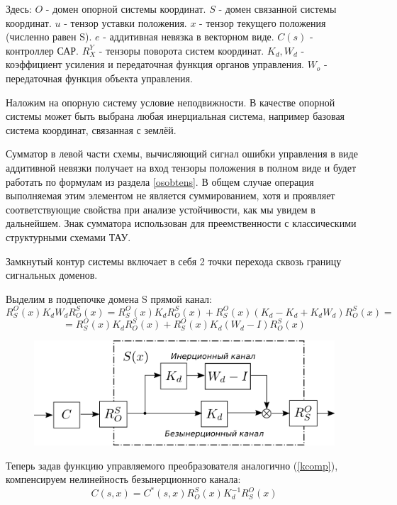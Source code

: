\documentclass[a4paper]{article}
\begin{document}
Здесь:
$O$ - домен опорной системы координат. 
$S$ - домен связанной системы координат.
$u$ - тензор уставки положения.
$x$ - тензор текущего положения (численно равен S).
$e$ - аддитивная невязка в векторном виде.
$C(s)$ - контроллер САР.
$R_X^Y$ - тензоры поворота систем координат.
$K_d, W_d$ - коэффициент усиления и передаточная функция органов управления.
$W_o$ - передаточная функция объекта управления.

Наложим на опорную систему условие неподвижности. В качестве опорной системы может быть выбрана любая инерциальная система, например базовая система координат, связанная с землёй.

Сумматор в левой части схемы, вычисляющий сигнал ошибки управления в виде аддитивной невязки получает на вход тензоры положения в полном виде и будет работать по формулам из раздела \ref{osobtens}. В общем случае операция выполняемая этим элементом не является суммированием, хотя и проявляет соответствующие свойства при анализе устойчивости, как мы увидем в дальнейшем. Знак сумматора использован для преемственности с классическими структурными схемами ТАУ.

Замкнутый контур системы включает в себя 2 точки перехода сквозь границу сигнальных доменов.

Выделим в подцепочке домена S прямой канал:
\begin{equation*} 
R_S^O(x) K_d W_d R_O^S(x) = R_S^O(x) K_d R_O^S(x) + R_S^O(x) (K_d - K_d + K_d W_d) R_O^S(x) = 
\end{equation*}
\begin{equation} 
=R_S^O(x) K_d R_O^S(x) + R_S^O(x) K_d (W_d - I) R_O^S(x) 
\end{equation}

{
\begin{figure}[H]
\centering
\includegraphics{./src/sheme2.png}
\end{figure}
}

Теперь задав функцию управляемого преобразователя аналогично (\ref{kcomp}), компенсируем нелинейность безынерционного канала:
\begin{equation} C(s,x) = C^*(s,x) R_O^S(x) K_{d}^{-1} R_S^O(x) \end{equation}
\end{document}
